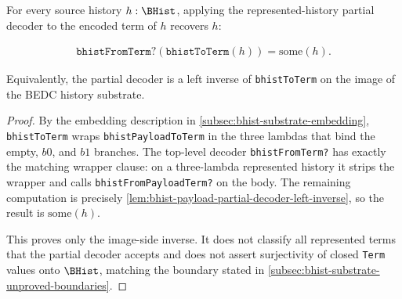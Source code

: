 \begin{theorem}
\label{thm:bhist-encoded-term-partial-decoder-left-inverse}
For every source history $h:\BHist$, applying the represented-history partial decoder to the encoded term of $h$ recovers $h$:

$$
\begin{aligned}
\texttt{bhistFromTerm?}(\texttt{bhistToTerm}(h))
  = \mathrm{some}(h).
\end{aligned}
$$

Equivalently, the partial decoder is a left inverse of \texttt{bhistToTerm} on the image of the BEDC history substrate.
\end{theorem}
\begin{proof}
By the embedding description in \autoref{subsec:bhist-substrate-embedding}, \texttt{bhistToTerm} wraps \texttt{bhistPayloadToTerm} in the three lambdas that bind the empty, $b0$, and $b1$ branches. The top-level decoder \texttt{bhistFromTerm?} has exactly the matching wrapper clause: on a three-lambda represented history it strips the wrapper and calls \texttt{bhistFromPayloadTerm?} on the body. The remaining computation is precisely \autoref{lem:bhist-payload-partial-decoder-left-inverse}, so the result is $\mathrm{some}(h)$.

This proves only the image-side inverse. It does not classify all represented terms that the partial decoder accepts and does not assert surjectivity of closed \texttt{Term} values onto $\BHist$, matching the boundary stated in \autoref{subsec:bhist-substrate-unproved-boundaries}.
\end{proof}
